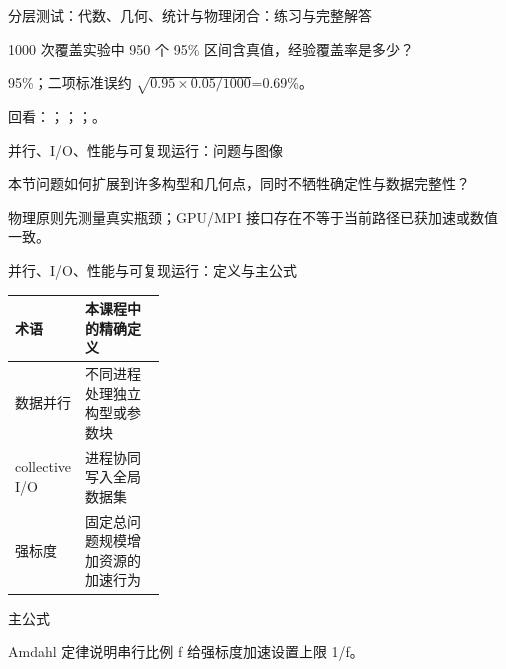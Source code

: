 \begin{frame}[t]{分层测试：代数、几何、统计与物理闭合：练习与完整解答}
\footnotesize
\begin{block}{}1000 次覆盖实验中 950 个 95\% 区间含真值，经验覆盖率是多少？\end{block}
\begin{exampleblock}{}95\%；二项标准误约 \ensuremath{\sqrt{0.95\times 0.05/1000}}=0.69\%。\end{exampleblock}
\vfill
\scriptsize 回看：；；；。
\end{frame}

\begin{frame}[t]{并行、I/\allowbreak{}O、性能与可复现运行：问题与图像}
\footnotesize
\begin{block}{本节问题}如何扩展到许多构型和几何点，同时不牺牲确定性与数据完整性？\end{block}
\begin{block}{物理原则}\quad 先测量真实瓶颈；GPU/\allowbreak{}MPI 接口存在不等于当前路径已获加速或数值一致。\end{block}
\end{frame}

\begin{frame}[t]{并行、I/\allowbreak{}O、性能与可复现运行：定义与主公式}
\footnotesize\begin{tabularx}{\linewidth}{p{0.30\linewidth}Y}
\toprule 术语 & 本课程中的精确定义\\\midrule
{} 数据并行 & 不同进程处理独立构型或参数块\\
 collective I/\allowbreak{}O & 进程协同写入全局数据集\\
 强标度 & 固定总问题规模增加资源的加速行为\\
\bottomrule\end{tabularx}\vspace{0.15cm}
\begin{block}{ 主公式}\centering{}\end{block}
Amdahl 定律说明串行比例 f 给强标度加速设置上限 1/\allowbreak{}f。
\end{frame}

